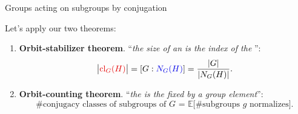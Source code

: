 \documentclass[8pt, handout]{beamer}
\newcommand{\Pause}{\pause}      %
\begin{document}
\begin{frame}{Groups acting on subgroups by conjugation} %
  
  Let's apply our two theorems: 
  \begin{enumerate}
  \item \textbf{Orbit-stabilizer theorem}. ``\emph{the size of an
   is the index of the }'': \Pause
    \[
    \big|\Alert{\cl_G(H)}\big|=[G:\Balert{N_G(H)}]=\frac{|G|}{|N_G(H)|}.
    \]
    
    \vspace{-2mm}\Pause
    
  \item \textbf{Orbit-counting theorem}. ``\emph{the  is the  fixed by a
    group element}'': \Pause
    \[
    \text{\#conjugacy classes of subgroups of $G$ = $\mathbb{E}\big[\text{\# subgroups $g$ normalizes}\big]$}.
    \]
  \end{enumerate}
  
  \Pause\vspace{-1mm}
  

\end{frame}
\end{document}
